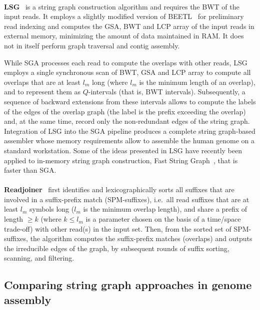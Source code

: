 \documentclass[11pt,oneside,a4paper]{article}
\begin{document}
\paragraph{}
\textbf{LSG}~\cite{Bonizzoni2015} is a string graph construction algorithm and requires the BWT of the input reads.
It employs a slightly modified version of BEETL~\cite{Bauer2011} for preliminary read indexing and computes the
GSA, BWT and LCP array of the input reads in external memory, minimizing the amount of data maintained in RAM.
It does not in itself perform graph traversal and contig assembly.

While SGA processes each read to compute the overlaps with other reads,  LSG  employs a single synchronous scan of BWT, GSA and LCP array to compute all overlaps that are at least $l_m$ long
(where $l_m$ is the minimum length of an overlap), and to represent them as $Q$-intervals (that is, BWT intervals).
Subsequently, a sequence of backward extensions from these intervals allows to compute the labels of the edges of the overlap graph (the label is the prefix exceeding the overlap) and, at the same time, record only the non-redundant edges of the string graph. Integration of LSG into the SGA pipeline produces a complete string graph-based assembler whose memory requirements allow to assemble the human genome on a standard workstation.
Some of the ideas presented in LSG have recently been applied to in-memory string graph construction, Fast String Graph~\cite{isbra2016-fsg}, that is faster
than SGA.    

\paragraph{}
\textbf{Readjoiner}~\cite{readjoiner} first identifies and lexicographically sorts all suffixes that are involved in a suffix-prefix match  (SPM-suffixes), i.e.~all read
suffixes that are at least $l_m$ symbols long ($l_m$ is the minimum overlap
length), and share a prefix of length $\geq k$ (where $k \leq l_m$ is a parameter chosen on the basis of a time/space trade-off) with other read(s) in the input set.
Then, from the sorted set of SPM-suffixes, the algorithm computes the
suffix-prefix matches (overlaps) and outputs the irreducible edges of the graph, by subsequent rounds of suffix sorting, scanning, and filtering.

\subsection{Comparing string graph approaches in genome assembly}
\end{document}
